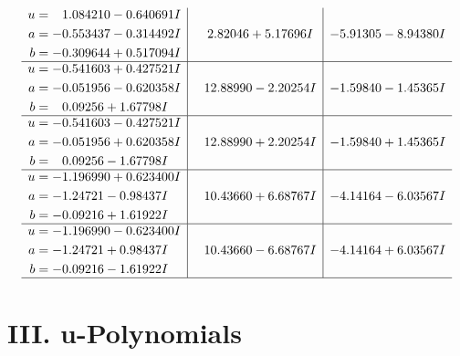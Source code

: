 \documentclass[1p]{elsarticle_modified}
\theoremstyle{definition}
\begin{document}
$$\begin{array}{c|c|c}
\begin{aligned}
u &= \phantom{-}1.084210 - 0.640691 I \\
a &= -0.553437 - 0.314492 I \\
b &= -0.309644 + 0.517094 I\end{aligned}
 & \phantom{-}2.82046 + 5.17696 I & -5.91305 - 8.94380 I \\ \hline\begin{aligned}
u &= -0.541603 + 0.427521 I \\
a &= -0.051956 - 0.620358 I \\
b &= \phantom{-}0.09256 + 1.67798 I\end{aligned}
 & \phantom{-}12.88990 - 2.20254 I & -1.59840 - 1.45365 I \\ \hline\begin{aligned}
u &= -0.541603 - 0.427521 I \\
a &= -0.051956 + 0.620358 I \\
b &= \phantom{-}0.09256 - 1.67798 I\end{aligned}
 & \phantom{-}12.88990 + 2.20254 I & -1.59840 + 1.45365 I \\ \hline\begin{aligned}
u &= -1.196990 + 0.623400 I \\
a &= -1.24721 - 0.98437 I \\
b &= -0.09216 + 1.61922 I\end{aligned}
 & \phantom{-}10.43660 + 6.68767 I & -4.14164 - 6.03567 I \\ \hline\begin{aligned}
u &= -1.196990 - 0.623400 I \\
a &= -1.24721 + 0.98437 I \\
b &= -0.09216 - 1.61922 I\end{aligned}
 & \phantom{-}10.43660 - 6.68767 I & -4.14164 + 6.03567 I\\
 \hline 
 \end{array}$$\newpage
\newpage\renewcommand{\arraystretch}{1}
\centering \section*{ III. u-Polynomials}
\end{document}
